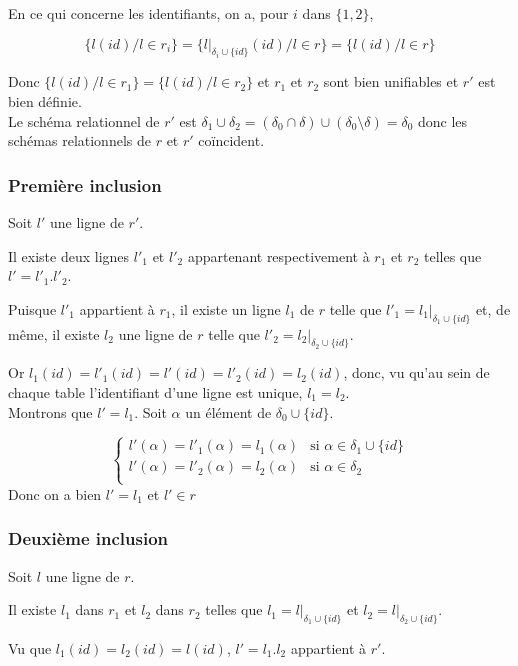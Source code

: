 \documentclass[french]{article}
\newcommand{\cip}{\cup \{id\}}
\begin{document}
En ce qui concerne les identifiants, on a,
pour $i$ dans $\{1, 2\}$, 

$$
\{ l(id) / l \in r_i \}
= \{ l|_{\delta_i \cip}(id) / l \in r\}
= \{l(id) / l \in r \}
$$

Donc $\{ l(id) / l \in r_1 \}
= \{ l(id) / l \in r_2 \}$
et $r_1$ et $r_2$ sont bien
unifiables et $r'$ est bien définie. \\

Le schéma relationnel de $r'$ est
$\delta_1 \cup \delta_2
= (\delta_0 \cap \delta) \cup (\delta_0 \setminus \delta)
= \delta_0$ donc les schémas relationnels de $r$ et $r'$
coïncident.

\subsubsection*{Première inclusion}
Soit $l'$ une ligne de $r'$.

Il existe deux lignes $l'_1$ et $l'_2$
appartenant respectivement à $r_1$ et $r_2$
telles que $l' = l'_1 . l'_2$.

Puisque $l'_1$ appartient à $r_1$,
il existe un ligne $l_1$ de $r$
telle que $l'_1 = l_1 |_{\delta_1 \cip}$
et, de même, il existe $l_2$ une ligne de $r$
telle que $l'_2 = l_2 |_{\delta_2 \cip}$.

Or $l_1(id) = l'_1(id) = l'(id) = l'_2(id) = l_2(id)$,
donc, vu qu'au sein de chaque table l'identifiant d'une ligne est unique,
$l_1 = l_2$. \\

Montrons que $l' = l_1$.
Soit $\alpha$ un élément de $\delta_0 \cip$.

$$
\left\lbrace
\begin{array}{ll}
l'(\alpha) = l'_1(\alpha) = l_1(\alpha)
& \text{si $\alpha \in \delta_1 \cip$} \\
l'(\alpha) = l'_2(\alpha) = l_2(\alpha)
& \text{si $\alpha \in \delta_2$} \\
\end{array}
\right.
$$
Donc on a bien $l' = l_1$ et $l' \in r$

\subsubsection*{Deuxième inclusion}
Soit $l$ une ligne de $r$.

Il existe $l_1$ dans $r_1$ et $l_2$ dans $r_2$
telles que $l_1 = l|_{\delta_1 \cip}$
et $l_2 = l|_{\delta_2 \cip}$.

Vu que $l_1(id) = l_2(id) = l(id)$,
$l' = l_1 .  l_2$ appartient à $r'$.
\end{document}
